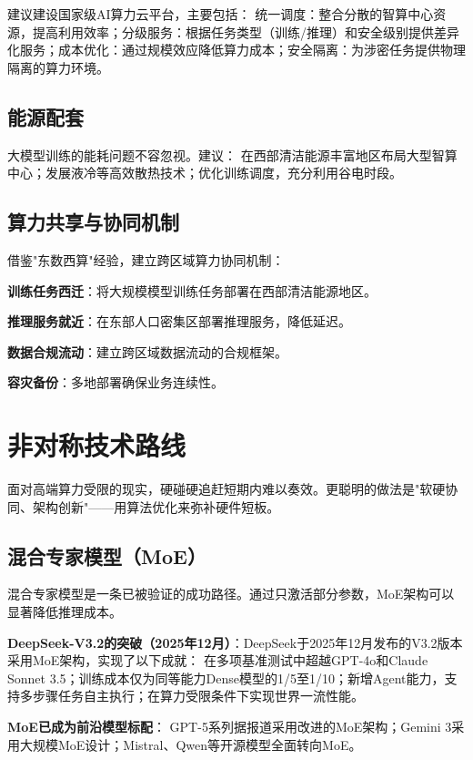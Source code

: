 建议建设国家级AI算力云平台，主要包括：
统一调度：整合分散的智算中心资源，提高利用效率；分级服务：根据任务类型（训练/推理）和安全级别提供差异化服务；成本优化：通过规模效应降低算力成本；安全隔离：为涉密任务提供物理隔离的算力环境。

\subsection{能源配套}

大模型训练的能耗问题不容忽视。建议：
在西部清洁能源丰富地区布局大型智算中心；发展液冷等高效散热技术；优化训练调度，充分利用谷电时段。

\subsection{算力共享与协同机制}

借鉴"东数西算"经验，建立跨区域算力协同机制：

\textbf{训练任务西迁}：将大规模模型训练任务部署在西部清洁能源地区。

\textbf{推理服务就近}：在东部人口密集区部署推理服务，降低延迟。

\textbf{数据合规流动}：建立跨区域数据流动的合规框架。

\textbf{容灾备份}：多地部署确保业务连续性。

\section{非对称技术路线}

面对高端算力受限的现实，硬碰硬追赶短期内难以奏效。更聪明的做法是"软硬协同、架构创新"——用算法优化来弥补硬件短板。

\subsection{混合专家模型（MoE）}

混合专家模型是一条已被验证的成功路径。通过只激活部分参数，MoE架构可以显著降低推理成本。

\textbf{DeepSeek-V3.2的突破（2025年12月）}：DeepSeek于2025年12月发布的V3.2版本采用MoE架构，实现了以下成就：
在多项基准测试中超越GPT-4o和Claude Sonnet 3.5；训练成本仅为同等能力Dense模型的1/5至1/10；新增Agent能力，支持多步骤任务自主执行；在算力受限条件下实现世界一流性能。

\textbf{MoE已成为前沿模型标配}：
GPT-5系列据报道采用改进的MoE架构；Gemini 3采用大规模MoE设计；Mistral、Qwen等开源模型全面转向MoE。

